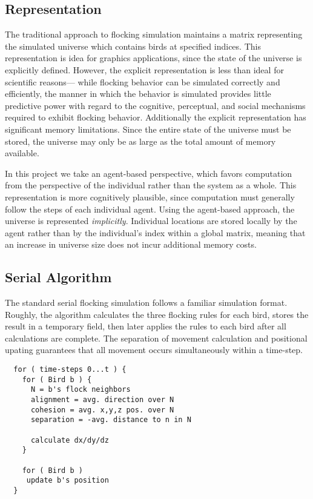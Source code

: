 \subsection*{Representation}
The traditional approach to flocking simulation maintains a matrix
representing the simulated universe which contains birds at specified
indices. This representation is idea for graphics applications, since
the state of the universe is explicitly defined. However, the explicit
representation is less than ideal for scientific reasons--- while
flocking behavior can be simulated correctly and efficiently, the
manner in which the behavior is simulated provides little predictive
power with regard to the cognitive, perceptual, and social mechanisms
required to exhibit flocking behavior. Additionally the explicit
representation has significant memory limitations. Since the entire
state of the universe must be stored, the universe may only be as
large as the total amount of memory available.

In this project we take an agent-based perspective, which favors
computation from the perspective of the individual rather than the
system as a whole. This representation is more cognitively plausible,
since computation must generally follow the steps of each individual
agent. Using the agent-based approach, the universe is represented
\emph{implicitly}. Individual locations are stored locally by the
agent rather than by the individual's index within a global matrix,
meaning that an increase in universe size does not incur additional
memory costs. 

\subsection*{Serial Algorithm}
The standard serial flocking simulation follows a familiar simulation
format. Roughly, the algorithm calculates the three flocking rules for
each bird, stores the result in a temporary field, then later applies
the rules to each bird after all calculations are complete. The
separation of movement calculation and positional upating guarantees
that all movement occurs simultaneously within a time-step.

\begin{verbatim}
  for ( time-steps 0...t ) {
    for ( Bird b ) {
      N = b's flock neighbors
      alignment = avg. direction over N
      cohesion = avg. x,y,z pos. over N
      separation = -avg. distance to n in N

      calculate dx/dy/dz
    }

    for ( Bird b )
     update b's position
  }
\end{verbatim}

